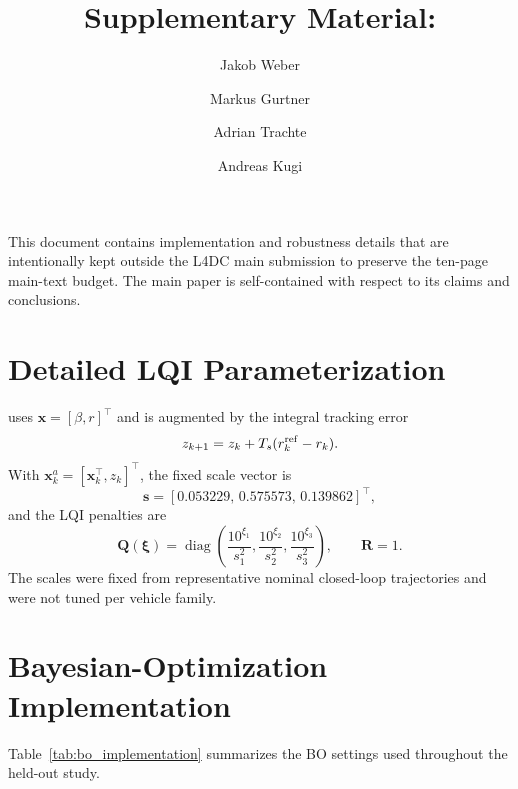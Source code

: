 \documentclass[11pt]{article}
\title{Supplementary Material: \JWrev{Fleet-Informed Bayesian Optimization for Controller Calibration across Heterogeneous Systems}}
\author{Jakob Weber \and Markus Gurtner \and Adrian Trachte \and Andreas Kugi}
\date{}
\begin{document}
\maketitle

This document contains implementation and robustness details that are intentionally kept outside the L4DC main submission to preserve the ten-page main-text budget. The main paper is self-contained with respect to its claims and conclusions.

\section{Detailed LQI Parameterization}

 uses $\mathbf{x}=[\beta,r]^\top$ and is augmented by the integral tracking error
\begin{equation}
 z_{k+1}=z_k+T_s(r_k^{\rm ref}-r_k).
\end{equation}
With $\mathbf{x}_k^a=[\mathbf{x}_k^\top,z_k]^\top$, the fixed scale vector is
\begin{equation}
 \mathbf{s}=[0.053229,\,0.575573,\,0.139862]^\top,
\end{equation}
and the LQI penalties are
\begin{equation}
 \mathbf Q(\boldsymbol{\xi})
 =\operatorname{diag}\!\left(
 \frac{10^{\xi_1}}{s_1^2},
 \frac{10^{\xi_2}}{s_2^2},
 \frac{10^{\xi_3}}{s_3^2}\right),
 \qquad \mathbf R=1.
\end{equation}
The scales were fixed  from representative nominal closed-loop trajectories and were not tuned per vehicle family.

\section{Bayesian-Optimization Implementation}

Table~\ref{tab:bo_implementation} summarizes the BO settings used throughout the held-out study.
\end{document}
